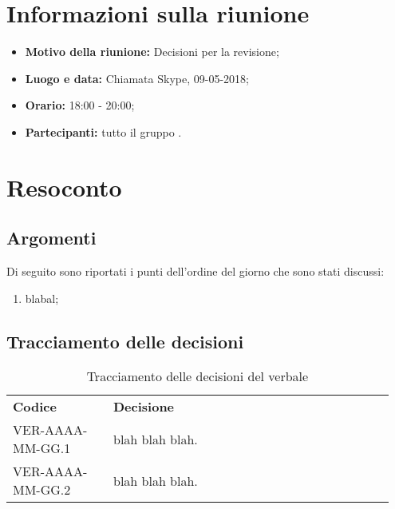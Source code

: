 \documentclass[VER-2018-05-09.tex]{subfiles}
\begin{document}
\chapter{Informazioni sulla riunione}
\begin{itemize}
	\item \textbf{Motivo della riunione:} Decisioni per la revisione;
	\item \textbf{Luogo e data:} Chiamata Skype, 09-05-2018;
	\item \textbf{Orario:} 18:00 - 20:00;
	\item \textbf{Partecipanti:} tutto il gruppo \gruppo.
\end{itemize}



\chapter{Resoconto}
\section{Argomenti}
Di seguito sono riportati i punti dell'ordine del giorno che sono stati discussi:
\begin{enumerate}
	\item blabal;
\end{enumerate}
\section{Tracciamento delle decisioni}
\begin{table}[H]
	\begin{center}
		\begin{tabu} to 
			\tableHeaderStyle
			\textbf{Codice} & \textbf{Decisione} \\
			VER-AAAA-MM-GG.1 & blah blah blah. \\
			VER-AAAA-MM-GG.2 & blah blah blah. \\
		\end{tabu}
		\caption{Tracciamento delle decisioni del verbale}
	\end{center}
\end{table}
\end{document}
